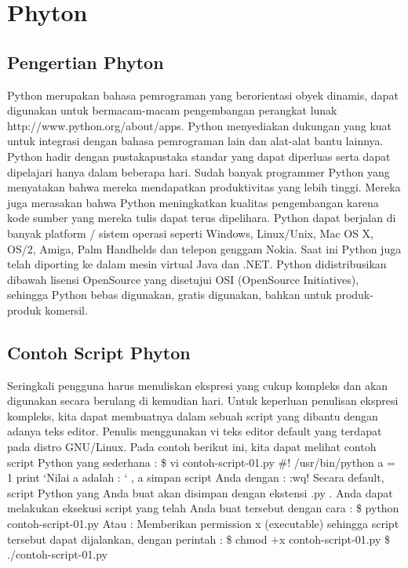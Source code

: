 
\section{Phyton} 
\subsection{Pengertian Phyton}
Python merupakan bahasa pemrograman yang
berorientasi obyek dinamis, dapat digunakan
untuk bermacam-macam pengembangan perangkat
lunak http://www.python.org/about/apps. Python
menyediakan dukungan yang kuat untuk integrasi
dengan bahasa pemrograman lain dan alat-alat
bantu lainnya. Python hadir dengan pustakapustaka
standar yang dapat diperluas serta dapat
dipelajari hanya dalam beberapa hari. Sudah
banyak programmer Python yang menyatakan
bahwa mereka mendapatkan produktivitas yang
lebih tinggi. Mereka juga merasakan bahwa Python
meningkatkan kualitas pengembangan karena kode
sumber yang mereka tulis dapat terus dipelihara.
Python dapat berjalan di banyak platform / sistem
operasi seperti Windows, Linux/Unix, Mac OS X,
OS/2, Amiga, Palm Handhelds dan telepon genggam
Nokia. Saat ini Python juga telah diporting ke dalam
mesin virtual Java dan .NET.
Python didistribusikan dibawah lisensi
OpenSource yang disetujui OSI (OpenSource
Initiatives), sehingga Python bebas digunakan,
gratis digunakan, bahkan untuk produk-produk
komersil.

\subsection{Contoh Script Phyton}
Seringkali pengguna harus menuliskan ekspresi yang cukup kompleks dan akan digunakan secara berulang di kemudian hari. 
Untuk keperluan penulisan ekspresi kompleks, kita dapat membuatnya dalam sebuah script yang dibantu dengan adanya teks editor. 
Penulis menggunakan vi teks editor default yang terdapat pada distro GNU/Linux. Pada contoh berikut ini, 
kita dapat melihat contoh script Python yang sederhana : 
\$ vi contoh-script-01.py \#! /usr/bin/python a = 1 print 
‘Nilai a adalah : ‘ , a simpan script Anda dengan : :wq! Secara default, script Python yang Anda buat akan disimpan dengan ekstensi .py . 
Anda dapat melakukan eksekusi script yang telah Anda buat tersebut dengan cara : 
\$ python contoh-script-01.py 
Atau : Memberikan permission x (executable) sehingga script tersebut dapat dijalankan, 
dengan perintah : \$ chmod +x contoh-script-01.py \$ ./contoh-script-01.py


